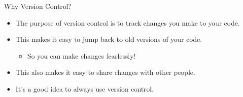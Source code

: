 \begin{frame}{Why Version Control?}

 \begin{itemize}

  \item The purpose of version control is to track changes you make to your 
   code.

  \item This makes it easy to jump back to old versions of your code.

  \begin{itemize}
   \item So you can make changes fearlessly!
  \end{itemize}

  \item This also makes it easy to share changes with other people.

  \item It's a good idea to always use version control.
 
 \end{itemize}

\end{frame}


